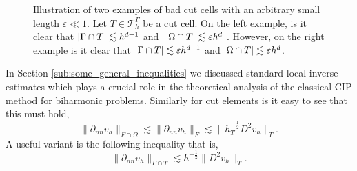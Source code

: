 \begin{figure}[b]
\begin{minipage}{0.4\textwidth}
    \end{minipage}
        \caption{Illustration of two examples of bad cut cells with an arbitrary small length $\varepsilon \ll 1 $. Let $T \in  \mathcal{T}^{\Gamma }_h $ be a cut cell.  On the left example, is it clear that $\left\lvert  \Gamma \cap T  \right\rvert
            \lesssim  h^{d-1}$ and $  \ \abs{ \Omega  \cap T } \lesssim  \varepsilon  h^{d}$  . However, on the right example is it clear that  $\left\lvert  \Gamma \cap T  \right\rvert
            \lesssim  \varepsilon h^{d-1}$ and $\left\lvert  \Omega  \cap T  \right\rvert \lesssim  \varepsilon  h^{d}$.}
        \label{fig:intersection-example}
\end{figure}


In Section \ref{sub:some_general_inequalities} we discussed standard local inverse estimates which plays a crucial role in the theoretical analysis of the classical CIP method for biharmonic problems.
Similarly for cut elements is it easy to see that this must hold,
\begin{equation}
    \label{eq:inv_full1}
     \| \partial _{nn}  v_{h} \|_{F \cap \Omega    }^{  }  \lesssim\| \partial _{nn}  v_{h} \|_{F }^{  }  \lesssim   \| h_{T}^{-\frac{1}{2}} D ^2 v_{h} \|_{ T }^{  }.
\end{equation}
A useful variant is the following inequality that is,
\begin{equation}
    \label{eq:inv_full}
\| \partial _{nn} v_{h} \|_{ \Gamma \cap T  }^{  } \lesssim h^{-\frac{1}{2}} \| D^2 v_{h} \|_{ T }^{  }.
\end{equation}

